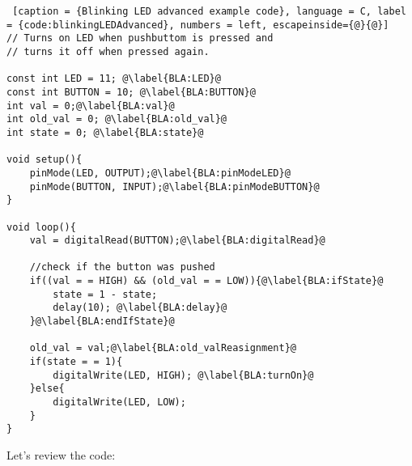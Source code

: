 \begin{lstlisting} [caption = {Blinking LED advanced example code}, language = C, label = {code:blinkingLEDAdvanced}, numbers = left, escapeinside={@}{@}]
// Turns on LED when pushbuttom is pressed and
// turns it off when pressed again.

const int LED = 11; @\label{BLA:LED}@
const int BUTTON = 10; @\label{BLA:BUTTON}@
int val = 0;@\label{BLA:val}@
int old_val = 0; @\label{BLA:old_val}@
int state = 0; @\label{BLA:state}@

void setup(){
	pinMode(LED, OUTPUT);@\label{BLA:pinModeLED}@
	pinMode(BUTTON, INPUT);@\label{BLA:pinModeBUTTON}@
}

void loop(){
	val = digitalRead(BUTTON);@\label{BLA:digitalRead}@
	
	//check if the button was pushed
	if((val = = HIGH) && (old_val = = LOW)){@\label{BLA:ifState}@
		state = 1 - state;
		delay(10); @\label{BLA:delay}@
	}@\label{BLA:endIfState}@
	
	old_val = val;@\label{BLA:old_valReasignment}@
	if(state = = 1){
		digitalWrite(LED, HIGH); @\label{BLA:turnOn}@
	}else{
		digitalWrite(LED, LOW);
	}
}
\end{lstlisting}

Let's review the code:


